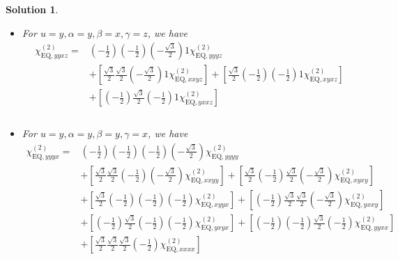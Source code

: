 \documentclass[UTF8,10pt,a4paper]{article}
\theoremstyle{Problem}
\theoremstyle{Solution}
\newtheorem*{sol}{Solution}
\begin{document}
\begin{sol}
\begin{itemize}
\begin{align}
&+\left[\frac{\sqrt{3}}{2}\frac{\sqrt{3}}{2}\left(-\frac{1}{2}\right)\frac{\sqrt{3}}{2}\chi_{\text{EQ},xxxx}^{(2)}\right]
\end{align}\normalsize
\item For $u=y,\alpha=y,\beta=x,\gamma=z$, we have
\footnotesize\begin{align}
\nonumber\chi_{\text{EQ},yyxz}^{(2)}=&\left(-\frac{1}{2}\right)\left(-\frac{1}{2}\right)\left(-\frac{\sqrt{3}}{2}\right)1\chi_{\text{EQ},yyyz}^{(2)}\\
\nonumber&+\left[\frac{\sqrt{3}}{2}\frac{\sqrt{3}}{2}\left(-\frac{\sqrt{3}}{2}\right)1\chi_{\text{EQ},xxyz}^{(2)}\right]+\left[\frac{\sqrt{3}}{2}\left(-\frac{1}{2}\right)\left(-\frac{1}{2}\right)1\chi_{\text{EQ},xyxz}^{(2)}\right]\\
\nonumber&+\left[\left(-\frac{1}{2}\right)\frac{\sqrt{3}}{2}\left(-\frac{1}{2}\right)1\chi_{\text{EQ},yxxz}^{(2)}\right]\\
\nonumber&\\
&
\end{align}\normalsize
\item For $u=y,\alpha=y,\beta=y,\gamma=x$, we have
\footnotesize\begin{align}
\nonumber\chi_{\text{EQ},yyyx}^{(2)}=&\left(-\frac{1}{2}\right)\left(-\frac{1}{2}\right)\left(-\frac{1}{2}\right)\left(-\frac{\sqrt{3}}{2}\right)\chi_{\text{EQ},yyyy}^{(2)}\\
\nonumber&+\left[\frac{\sqrt{3}}{2}\frac{\sqrt{3}}{2}\left(-\frac{1}{2}\right)\left(-\frac{\sqrt{3}}{2}\right)\chi_{\text{EQ},xxyy}^{(2)}\right]+\left[\frac{\sqrt{3}}{2}\left(-\frac{1}{2}\right)\frac{\sqrt{3}}{2}\left(-\frac{\sqrt{3}}{2}\right)\chi_{\text{EQ},xyxy}^{(2)}\right]\\
\nonumber&+\left[\frac{\sqrt{3}}{2}\left(-\frac{1}{2}\right)\left(-\frac{1}{2}\right)\left(-\frac{1}{2}\right)\chi_{\text{EQ},xyyx}^{(2)}\right]+\left[\left(-\frac{1}{2}\right)\frac{\sqrt{3}}{2}\frac{\sqrt{3}}{2}\left(-\frac{\sqrt{3}}{2}\right)\chi_{\text{EQ},yxxy}^{(2)}\right]\\
\nonumber&+\left[\left(-\frac{1}{2}\right)\frac{\sqrt{3}}{2}\left(-\frac{1}{2}\right)\left(-\frac{1}{2}\right)\chi_{\text{EQ},yxyx}^{(2)}\right]+\left[\left(-\frac{1}{2}\right)\left(-\frac{1}{2}\right)\frac{\sqrt{3}}{2}\left(-\frac{1}{2}\right)\chi_{\text{EQ},yyxx}^{(2)}\right]\\
&+\left[\frac{\sqrt{3}}{2}\frac{\sqrt{3}}{2}\frac{\sqrt{3}}{2}\left(-\frac{1}{2}\right)\chi_{\text{EQ},xxxx}^{(2)}\right]
\end{align}\normalsize

\end{itemize}
\end{sol}
\end{document}
